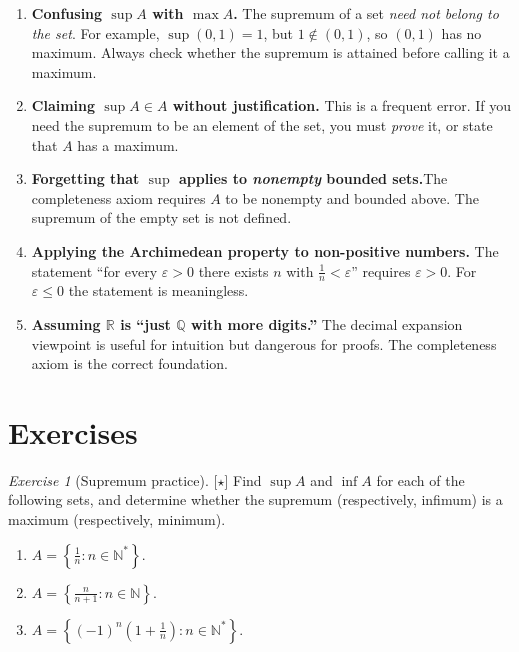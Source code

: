 \documentclass[12pt,a4paper,openany]{book}
\newcommand{\N}{\mathbb{N}}
\newcommand{\Q}{\mathbb{Q}}
\newcommand{\R}{\mathbb{R}}
\newcommand{\eps}{\varepsilon}
\theoremstyle{definition}
\theoremstyle{remark}
\newtheorem{exercise}{Exercise}[chapter]
\newcommand{\easy}{\textnormal{[$\star$]}}
\begin{document}
\begin{commonerrors}
\begin{enumerate}[label=\textbf{\arabic*.}]
  \item \textbf{Confusing $\sup A$ with $\max A$.}\quad
    The supremum of a set \emph{need not belong to the set}.  For example,
    $\sup(0,1)=1$, but $1 \notin (0,1)$, so $(0,1)$ has no maximum.
    Always check whether the supremum is attained before calling it a maximum.

  \item \textbf{Claiming $\sup A \in A$ without justification.}\quad
    This is a frequent error.  If you need the supremum to be an element of
    the set, you must \emph{prove} it, or state that $A$ has a maximum.

  \item \textbf{Forgetting that $\sup$ applies to \emph{nonempty} bounded
    sets.}\quad The completeness axiom requires $A$ to be nonempty and
    bounded above.  The supremum of the empty set is not defined.

  \item \textbf{Applying the Archimedean property to non-positive numbers.}%
    \quad The statement ``for every $\eps>0$ there exists $n$ with
    $\frac{1}{n}<\eps$'' requires $\eps > 0$.  For $\eps \leq 0$ the
    statement is meaningless.

  \item \textbf{Assuming $\R$ is ``just $\Q$ with more digits.''}\quad
    The decimal expansion viewpoint is useful for intuition but dangerous
    for proofs.  The completeness axiom is the correct foundation.
\end{enumerate}
\end{commonerrors}

\section{Exercises}
\label{sec:exercises-ch2}

\begin{exercise}[Supremum practice]\label{exo:sup1}\easy
Find $\sup A$ and $\inf A$ for each of the following sets, and determine
whether the supremum (respectively, infimum) is a maximum (respectively,
minimum).
\begin{enumerate}[label=(\alph*)]
  \item $A = \left\{\frac{1}{n} : n \in \N^*\right\}$.
  \item $A = \left\{\frac{n}{n+1} : n \in \N\right\}$.
  \item $A = \left\{(-1)^n\left(1 + \frac{1}{n}\right) : n \in \N^*\right\}$.
\end{enumerate}
\end{exercise}
\end{document}
